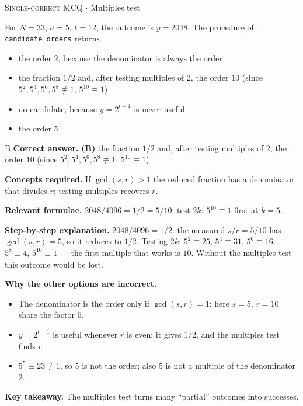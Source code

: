 \documentclass[11pt,a4paper]{article}
\newcommand{\optlabel}[1]{\textbf{(#1)}}
\newcommand{\correctlabel}[1]{\textcolor{okgreen}{\textbf{(#1)}\,\ding{51}}}
\newenvironment{qitem}[1]{\begin{list}{}{\setlength{\leftmargin}{3.3em}\setlength{\labelwidth}{3.1em}%
  \setlength{\labelsep}{0.2em}\setlength{\topsep}{3pt}\setlength{\parsep}{3pt}}\item[\textbf{Q.#1}\hfill]}{\end{list}}
\newcommand{\qsep}{\par\vspace{2pt}{\color{black!15}\hrule}\vspace{4pt}}
\newcommand{\qmeta}[2]{{\footnotesize\color{black!60}\textsc{#1} \;$\cdot$\; #2}\par}
\begin{document}
\begin{qitem}{49}
\qmeta{Single-correct MCQ}{Multiples test}
For $N = 33$, $a = 5$, $t = 12$, the outcome is $y = 2048$. The procedure of \texttt{candidate\_orders} returns
\begin{itemize}[leftmargin=2.6em, labelsep=0.4em, itemsep=2pt, topsep=3pt]
\item[\optlabel{A}] the order $2$, because the denominator is always the order
\item[\correctlabel{B}] the fraction $1/2$ and, after testing multiples of $2$, the order $10$ (since $5^2, 5^4, 5^6, 5^8 \not\equiv 1$, $5^{10} \equiv 1$)
\item[\optlabel{C}] no candidate, because $y = 2^{t-1}$ is never useful
\item[\optlabel{D}] the order $5$
\end{itemize}
\end{qitem}
\begin{solbox}{B}
\textbf{\color{brand}Correct answer.} \textcolor{okgreen}{\textbf{(B)}} the fraction $1/2$ and, after testing multiples of $2$, the order $10$ (since $5^2, 5^4, 5^6, 5^8 \not\equiv 1$, $5^{10} \equiv 1$)

\textbf{\color{brand}Concepts required.} If $\gcd(s, r) > 1$ the reduced fraction has a denominator that divides $r$; testing multiples recovers $r$.

\textbf{\color{brand}Relevant formulae.} $2048/4096 = 1/2 = 5/10$; test $2k$: $5^{10} \equiv 1$ first at $k = 5$.

\textbf{\color{brand}Step-by-step explanation.} $2048/4096 = 1/2$: the measured $s/r = 5/10$ has $\gcd(s, r) = 5$, so it reduces to $1/2$. Testing $2k$: $5^2 \equiv 25$, $5^4 \equiv 31$, $5^6 \equiv 16$, $5^8 \equiv 4$,
$5^{10} \equiv 1$ --- the first multiple that works is $10$. Without the multiples test this outcome would be lost.

\textbf{\color{brand}Why the other options are incorrect.}
\begin{itemize}[leftmargin=2.4em, itemsep=1pt, topsep=2pt]
\item[\textbf{(A)}] The denominator is the order only if $\gcd(s, r) = 1$; here $s = 5$, $r = 10$ share the factor $5$.
\item[\textbf{(C)}] $y = 2^{t-1}$ is useful whenever $r$ is even: it gives $1/2$, and the multiples test finds $r$.
\item[\textbf{(D)}] $5^5 \equiv 23 \ne 1$, so $5$ is not the order; also $5$ is not a multiple of the denominator $2$.
\end{itemize}
\textbf{\color{brand}Key takeaway.} The multiples test turns many ``partial'' outcomes into successes.
\end{solbox}
\qsep
\end{document}
